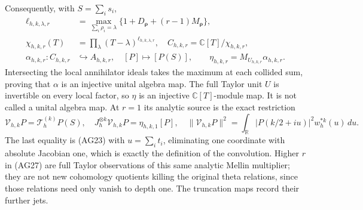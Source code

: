 Consequently, with $S=\sum_i s_i$,
\[
 \begin{split}
 \ell_{h,k,\lambda,r}
 &=\max_{\sum_i\rho_i=\lambda}
           \{1+D_{\boldsymbol\rho}+(r-1)M_{\boldsymbol\rho}\},\\
 \chi_{h,k,r}(T)&=\prod_\lambda(T-\lambda)^{\ell_{h,k,\lambda,r}},
 \quad C_{h,k,r}=\mathbb C[T]/\chi_{h,k,r},\\
 \alpha_{h,k,r}:C_{h,k,r}&\hookrightarrow A_{h,k,r},
                 \quad[P]\mapsto[P(S)],\qquad
 \eta_{h,k,r}=M_{U_{h,k,r}}\alpha_{h,k,r}.
 \end{split}\tag{AG28}
\]
Intersecting the local annihilator ideals takes the maximum at
each collided sum, proving that $\alpha$ is an injective unital
algebra map.  The full Taylor unit $U$ is invertible on every
local factor, so $\eta$ is an injective $\mathbb C[T]$-module
map.  It is not called a unital algebra map.
At $r=1$ its analytic source is the exact restriction
\[
 \mathcal V_{h,k}P=\mathcal T_h^{(k)}P(S),\quad
 J_h^{\otimes k}\mathcal V_{h,k}P=\eta_{h,k,1}[P],\quad
 \|\mathcal V_{h,k}P\|^2
 =\int_{\mathbb R}|P(k/2+iu)|^2 w_h^{*k}(u)\,du.
 \tag{AG29}
\]
The last equality is (AG23) with $u=\sum_i t_i$, eliminating
one coordinate with absolute Jacobian one, which is exactly the
definition of the convolution.  Higher $r$ in (AG27) are full
Taylor observations of this same analytic Mellin multiplier;
they are not new cohomology quotients killing the original
theta relations, since those relations need only vanish to
depth one.  The truncation maps record their further jets.

